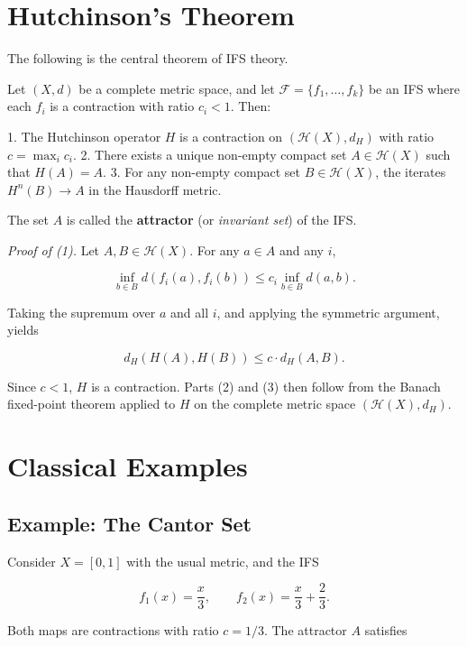 \section{Hutchinson's Theorem}

The following is the central theorem of IFS theory.

\begin{theorem}[Hutchinson, 1981]
Let $(X, d)$ be a complete metric space, and let $\mathcal{F} = \{ f_1, \ldots, f_k\} $ be an IFS where each $f_i$ is a contraction with ratio $c_i < 1$. Then:

1. The Hutchinson operator $H$ is a contraction on $(\mathcal{H}(X), d_H)$ with ratio $c = \max_i c_i$.
2. There exists a unique non-empty compact set $A \in \mathcal{H}(X)$ such that $H(A) = A$.
3. For any non-empty compact set $B \in \mathcal{H}(X)$, the iterates $H^n(B) \to A$ in the Hausdorff metric.

The set $A$ is called the \textbf{attractor} (or \textit{invariant set}) of the IFS.

\textit{Proof of (1).} Let $A, B \in \mathcal{H}(X)$. For any $a \in A$ and any $i$,

\[\inf_{b \in B} d(f_i(a), f_i(b)) \le c_i \inf_{b \in B} d(a, b).\]

Taking the supremum over $a$ and all $i$, and applying the symmetric argument, yields

\[d_H(H(A), H(B)) \le c \cdot d_H(A, B).\]

Since $c < 1$, $H$ is a contraction. Parts (2) and (3) then follow from the Banach fixed-point theorem applied to $H$ on the complete metric space $(\mathcal{H}(X), d_H)$. 

\end{theorem}


\section{Classical Examples}

\subsection*{Example: The Cantor Set}

Consider $X = [0, 1]$ with the usual metric, and the IFS

\[f_1(x) = \frac{x}{3}, \qquad f_2(x) = \frac{x}{3} + \frac{2}{3}.\]

Both maps are contractions with ratio $c = 1/3$. The attractor $A$ satisfies

